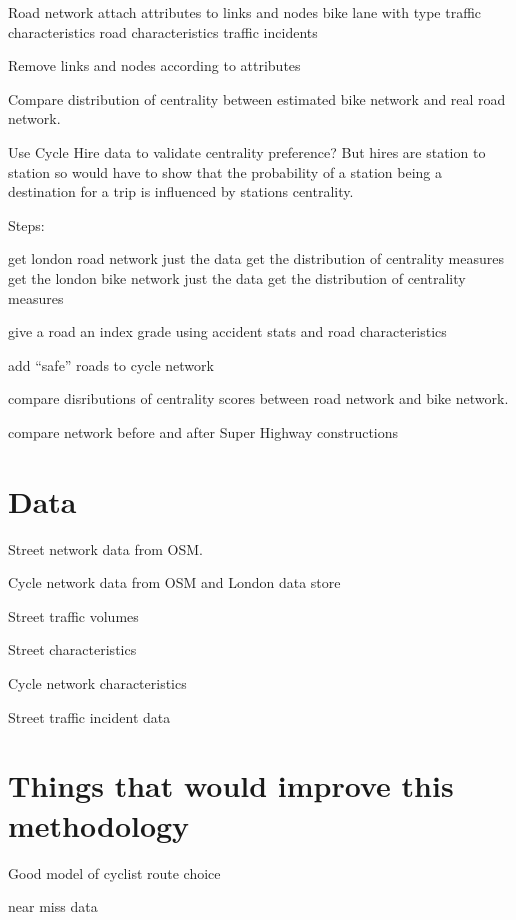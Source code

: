 \documentclass[11pt]{article} %
\begin{document}
Road network
	attach attributes to links and nodes
		bike lane with type
		traffic characteristics
		road characteristics
		traffic incidents
		
Remove links and nodes according to attributes

Compare distribution of centrality between estimated bike network and real road network. 

Use Cycle Hire data to validate centrality preference?
	But hires are station to station so would have to show that the probability of a station being a destination for a trip is influenced by stations centrality. 

Steps:

	get london road network
		just the data
		get the distribution of centrality measures
	get the london bike network
		just the data
		get the distribution of centrality measures
		
	give a road an index grade
		using accident stats and road characteristics
		
	add ``safe'' roads to cycle network
	
	compare disributions of centrality scores between road network and bike network. 
	
	compare network before and after Super Highway constructions


\section{Data}

Street network data from OSM.

Cycle network data from OSM and London data store

Street traffic volumes

Street characteristics

Cycle network characteristics

Street traffic incident data



\section{Things that would improve this methodology}

Good model of cyclist route choice

near miss data
\end{document}
